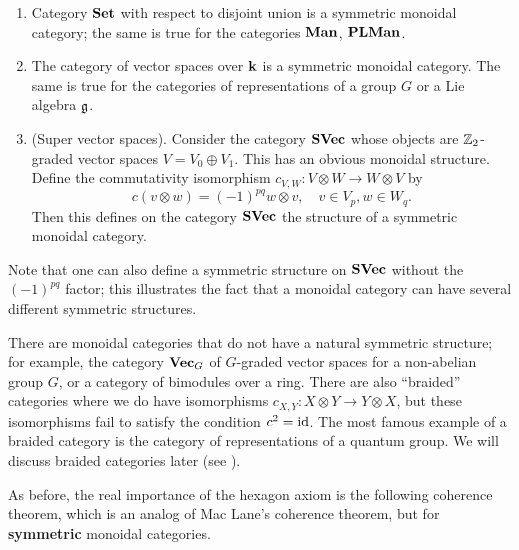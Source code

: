 \begin{example}\label{x:symmetric-monoidal-cats}\par\noindent
  \begin{enumerate}
    \item Category $\mathbf{Set}$ with respect to disjoint union is a
      symmetric monoidal category; the same is true for the categories
      $\mathbf{Man}$, $\mathbf{PLMan}$.
    \item
      The category of vector spaces over $\mathbf{k}$ is a symmetric monoidal category.
      The same is true for the categories of representations of a group $G$ or
      a Lie algebra $\mathfrak{g}$.
    \item (Super vector spaces). Consider the category $\mathbf{SVec}$ whose
      objects are $\mathbb{Z}_2$-graded vector spaces $V=V_0\oplus V_1$. This
      has an obvious monoidal structure.
      Define the commutativity isomorphism $c_{V,W}\colon V\otimes W
      \to W\otimes V$ by
      $$
      c(v\otimes w)=(-1)^{pq} w\otimes v, \quad v\in V_p, w\in W_q.
      $$
      Then this defines on the category $\mathbf{SVec}$ the structure of a
      symmetric monoidal category.
  \end{enumerate}
\end{example}
Note that one can also define a symmetric structure on $\mathbf{SVec}$ without the
$(-1)^{pq}$ factor; this illustrates the fact that a monoidal category can have
several different symmetric structures.
\begin{remark}\label{r:non-symmetric}
  There are monoidal categories that do not have a natural symmetric structure;
  for example, the category $\mathbf{Vec}_G$ of $G$-graded vector spaces for a
  non-abelian group $G$, or a category of bimodules over a ring. There are also
  ``braided'' categories where we do have isomorphisms
  $c_{X,Y}\colon X\otimes Y \to Y\otimes X$, but these isomorphisms fail to
  satisfy the condition $c^2=\operatorname{id}$. The most famous example of a braided category
  is the category of representations of a quantum group. We will discuss braided
  categories later (see ).
\end{remark}

As before, the real importance of the hexagon axiom is the following coherence
theorem, which is an analog of Mac Lane's coherence theorem, but for
\textbf{symmetric} monoidal categories.


